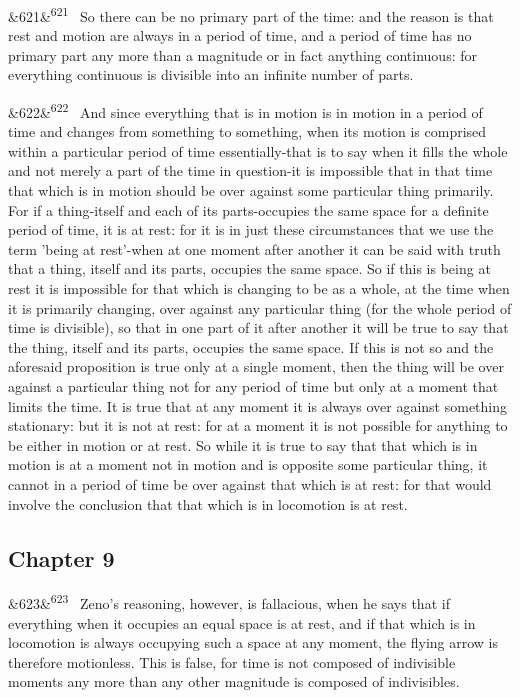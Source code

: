 \documentclass[12pt]{article}
\newcommand{\para}[1][]{\par\noindent\ifx&#1&\else\textsuperscript{\footnotesize #1}~\fi}
\begin{document}
\para[621] So there can be no primary part of the time: and the reason is that rest and motion are always in a period of time, and a period of time has no primary part any more than a magnitude or in fact anything continuous: for everything continuous is divisible into an infinite number of parts.

\para[622] And since everything that is in motion is in motion in a period of time and changes from something to something, when its motion is comprised within a particular period of time essentially-that is to say when it fills the whole and not merely a part of the time in question-it is impossible that in that time that which is in motion should be over against some particular thing primarily. For if a thing-itself and each of its parts-occupies the same space for a definite period of time, it is at rest: for it is in just these circumstances that we use the term 'being at rest'-when at one moment after another it can be said with truth that a thing, itself and its parts, occupies the same space. So if this is being at rest it is impossible for that which is changing to be as a whole, at the time when it is primarily changing, over against any particular thing (for the whole period of time is divisible), so that in one part of it after another it will be true to say that the thing, itself and its parts, occupies the same space. If this is not so and the aforesaid proposition is true only at a single moment, then the thing will be over against a particular thing not for any period of time but only at a moment that limits the time. It is true that at any moment it is always over against something stationary: but it is not at rest: for at a moment it is not possible for anything to be either in motion or at rest. So while it is true to say that that which is in motion is at a moment not in motion and is opposite some particular thing, it cannot in a period of time be over against that which is at rest: for that would involve the conclusion that that which is in locomotion is at rest.

\subsection*{Chapter 9}

\para[623] Zeno's reasoning, however, is fallacious, when he says that if everything when it occupies an equal space is at rest, and if that which is in locomotion is always occupying such a space at any moment, the flying arrow is therefore motionless. This is false, for time is not composed of indivisible moments any more than any other magnitude is composed of indivisibles.
\end{document}
